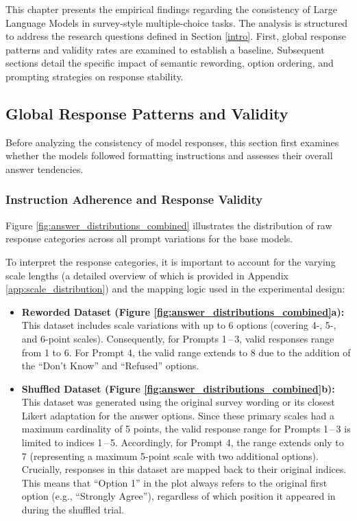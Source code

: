 This chapter presents the empirical findings regarding the consistency of Large Language Models in survey-style multiple-choice tasks. The analysis is structured to address the research questions defined in Section \ref{intro}. First, global response patterns and validity rates are examined to establish a baseline. Subsequent sections detail the specific impact of semantic rewording, option ordering, and prompting strategies on response stability.


\subsection{Global Response Patterns and Validity}
\label{results:overview}

Before analyzing the consistency of model responses, this section first examines whether the models followed formatting instructions and assesses their overall answer tendencies.

\subsubsection{Instruction Adherence and Response Validity}
\label{results:overview:answer_distributions}
Figure \ref{fig:answer_distributions_combined} illustrates the distribution of raw response categories across all prompt variations for the base models.

To interpret the response categories, it is important to account for the varying scale lengths (a detailed overview of which is provided in Appendix \ref{app:scale_distribution}) and the mapping logic used in the experimental design:

\begin{itemize}
    \item \textbf{Reworded Dataset (Figure \ref{fig:answer_distributions_combined}a):} This dataset includes scale variations with up to 6 options (covering 4-, 5-, and 6-point scales). Consequently, for Prompts 1\,--\,3, valid responses range from 1 to 6. For Prompt 4, the valid range extends to 8 due to the addition of the ``Don't Know'' and ``Refused'' options.
    
    \item \textbf{Shuffled Dataset (Figure \ref{fig:answer_distributions_combined}b):} This dataset was generated using the original survey wording or its closest Likert adaptation for the answer options. Since these primary scales had a maximum cardinality of 5 points, the valid response range for Prompts 1\,--\,3 is limited to indices 1\,--\,5. Accordingly, for Prompt 4, the range extends only to 7 (representing a maximum 5-point scale with two additional options). Crucially, responses in this dataset are mapped back to their original indices. This means that ``Option 1'' in the plot always refers to the original first option (e.g., ``Strongly Agree''), regardless of which position it appeared in during the shuffled trial.
\end{itemize}


